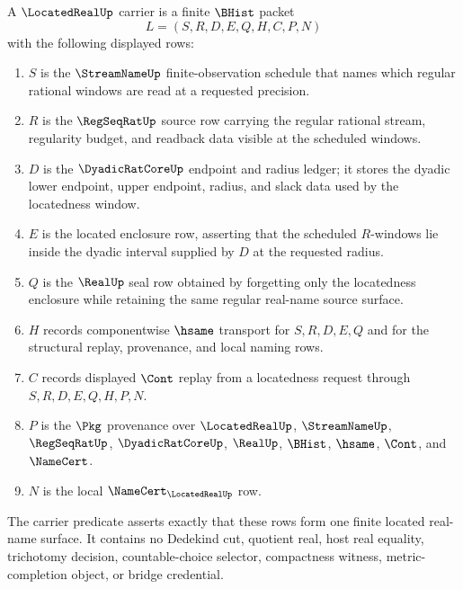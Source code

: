 \begin{definition}
\label{def:located-real-carrier}
A $\LocatedRealUp$ carrier is a finite $\BHist$ packet
$$
L=(S,R,D,E,Q,H,C,P,N)
$$
with the following displayed rows:
\begin{enumerate}
\item $S$ is the $\StreamNameUp$ finite-observation schedule that names which regular rational windows are read at a requested precision.
\item $R$ is the $\RegSeqRatUp$ source row carrying the regular rational stream, regularity budget, and readback data visible at the scheduled windows.
\item $D$ is the $\DyadicRatCoreUp$ endpoint and radius ledger; it stores the dyadic lower endpoint, upper endpoint, radius, and slack data used by the locatedness window.
\item $E$ is the located enclosure row, asserting that the scheduled $R$-windows lie inside the dyadic interval supplied by $D$ at the requested radius.
\item $Q$ is the $\RealUp$ seal row obtained by forgetting only the locatedness enclosure while retaining the same regular real-name source surface.
\item $H$ records componentwise $\hsame$ transport for $S,R,D,E,Q$ and for the structural replay, provenance, and local naming rows.
\item $C$ records displayed $\Cont$ replay from a locatedness request through $S,R,D,E,Q,H,P,N$.
\item $P$ is the $\Pkg$ provenance over $\LocatedRealUp$, $\StreamNameUp$, $\RegSeqRatUp$, $\DyadicRatCoreUp$, $\RealUp$, $\BHist$, $\hsame$, $\Cont$, and $\NameCert$.
\item $N$ is the local $\NameCert_{\LocatedRealUp}$ row.
\end{enumerate}
The carrier predicate asserts exactly that these rows form one finite located real-name surface. It contains no Dedekind cut, quotient real, host real equality, trichotomy decision, countable-choice selector, compactness witness, metric-completion object, or bridge credential.
\end{definition}


